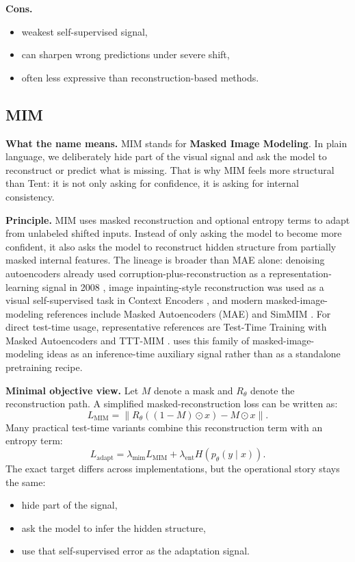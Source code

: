 \textbf{Cons.}
\begin{itemize}
  \item weakest self-supervised signal,
  \item can sharpen wrong predictions under severe shift,
  \item often less expressive than reconstruction-based methods.
\end{itemize}

\subsection{MIM}
\textbf{What the name means.}
MIM stands for \textbf{Masked Image Modeling}.
In plain language, we deliberately hide part of the visual signal and ask the model to reconstruct or predict what is missing.
That is why MIM feels more structural than Tent: it is not only asking for confidence, it is asking for internal consistency.

\textbf{Principle.}
MIM uses masked reconstruction and optional entropy terms to adapt from unlabeled shifted inputs. Instead of only asking the model to become more confident, it also asks the model to reconstruct hidden structure from partially masked internal features. The lineage is broader than MAE alone: denoising autoencoders already used corruption-plus-reconstruction as a representation-learning signal in 2008 \cite{vincent2008dae}, image inpainting-style reconstruction was used as a visual self-supervised task in Context Encoders \cite{pathak2016context}, and modern masked-image-modeling references include Masked Autoencoders (MAE) \cite{he2022mae} and SimMIM \cite{xie2022simmim}. For direct test-time usage, representative references are Test-Time Training with Masked Autoencoders \cite{gandelsman2022tttmae} and TTT-MIM \cite{mansour2024tttmim}. \yolozu{} uses this family of masked-image-modeling ideas as an inference-time auxiliary signal rather than as a standalone pretraining recipe.

\textbf{Minimal objective view.}
Let $M$ denote a mask and $R_{\theta}$ denote the reconstruction path.
A simplified masked-reconstruction loss can be written as:
\[
L_{\mathrm{MIM}} = \left\| R_{\theta}\!\left((1-M)\odot x\right) - M \odot x \right\|.
\]
Many practical test-time variants combine this reconstruction term with an entropy term:
\[
L_{\mathrm{adapt}} = \lambda_{\mathrm{mim}} L_{\mathrm{MIM}} + \lambda_{\mathrm{ent}} H\!\left(p_{\theta}(y \mid x)\right).
\]
The exact target differs across implementations, but the operational story stays the same:
\begin{itemize}
  \item hide part of the signal,
  \item ask the model to infer the hidden structure,
  \item use that self-supervised error as the adaptation signal.
\end{itemize}

